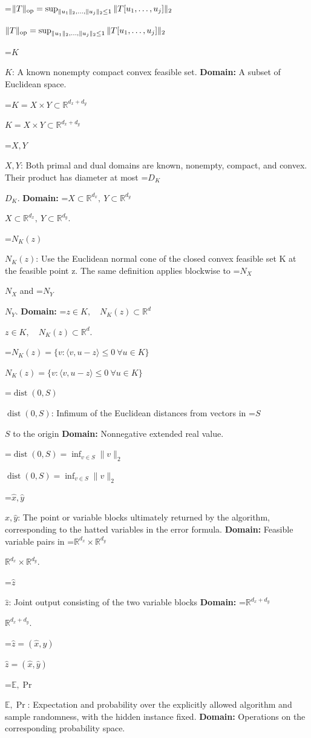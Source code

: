 \documentclass[10pt,a4paper]{article}
\newcommand{\AtlasMath}[1]{\par\begingroup\centering\setbox0=\hbox{$\displaystyle #1$}\ifdim\wd0>1.4\linewidth\typeout{ATLAS WIDE FORMULA: \the\wd0}\fi\ifdim\wd0>\linewidth\resizebox{\linewidth}{!}{\box0}\else\box0\fi\par\endgroup}
\newcommand{\AtlasInlineMath}[1]{\begingroup\setbox0=\hbox{$#1$}\ifdim\wd0>.4\linewidth\endgroup\AtlasMath{#1}\else\endgroup$#1$\fi}
\begin{document}
\AtlasInlineMath{\|T\|_{\rm op}=\sup_{\|u_1\|_2,\ldots,\|u_j\|_2\le1}\|T[u_1,\ldots,u_j]\|_2}



\AtlasInlineMath{K}: A known nonempty compact convex feasible set. \textbf{Domain:} A subset of Euclidean space.



\AtlasInlineMath{K=X\times Y\subset\mathbb R^{d_x+d_y}}



\AtlasInlineMath{X,Y}: Both primal and dual domains are known, nonempty, compact, and convex. Their product has diameter at most \AtlasInlineMath{D_K}. \textbf{Domain:} \AtlasInlineMath{X\subset\mathbb R^{d_x},\ Y\subset\mathbb R^{d_y}}.



\AtlasInlineMath{N_K(z)}: Use the Euclidean normal cone of the closed convex feasible set K at the feasible point z. The same definition applies blockwise to \AtlasInlineMath{N_X} and \AtlasInlineMath{N_Y}. \textbf{Domain:} \AtlasInlineMath{z\in K,\quad N_K(z)\subset\mathbb R^d}.



\AtlasInlineMath{N_K(z)=\{v:\langle v,u-z\rangle\le0\ \forall u\in K\}}



\AtlasInlineMath{\operatorname{dist}(0,S)}: Infimum of the Euclidean distances from vectors in \AtlasInlineMath{S} to the origin \textbf{Domain:} Nonnegative extended real value.



\AtlasInlineMath{\operatorname{dist}(0,S)=\inf_{v\in S}\|v\|_2}



\AtlasInlineMath{\widehat x,\widehat y}: The point or variable blocks ultimately returned by the algorithm, corresponding to the hatted variables in the error formula. \textbf{Domain:} Feasible variable pairs in \AtlasInlineMath{\mathbb R^{d_x}\times\mathbb R^{d_y}}.



\AtlasInlineMath{\widehat z}: Joint output consisting of the two variable blocks \textbf{Domain:} \AtlasInlineMath{\mathbb R^{d_x+d_y}}.



\AtlasInlineMath{\widehat z=(\widehat x,\widehat y)}



\AtlasInlineMath{\mathbb E,\Pr}: Expectation and probability over the explicitly allowed algorithm and sample randomness, with the hidden instance fixed. \textbf{Domain:} Operations on the corresponding probability space.
\end{document}
